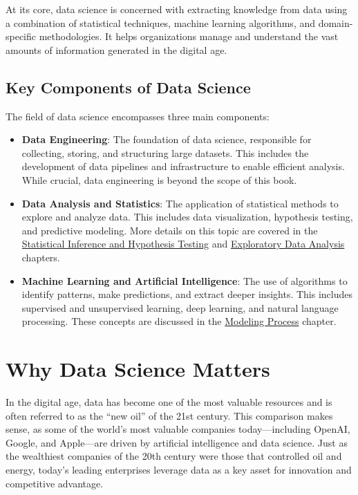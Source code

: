\documentclass[
  11pt,
]{book}
\providecommand{\tightlist}{%
  \setlength{\itemsep}{0pt}\setlength{\parskip}{0pt}}
\theoremstyle{definition}
\theoremstyle{definition}
\theoremstyle{definition}
\theoremstyle{definition}
\theoremstyle{remark}
\begin{document}
At its core, data science is concerned with extracting knowledge from data using a combination of statistical techniques, machine learning algorithms, and domain-specific methodologies. It helps organizations manage and understand the vast amounts of information generated in the digital age.

\subsection*{Key Components of Data Science}\label{key-components-of-data-science}


The field of data science encompasses three main components:

\begin{itemize}
\tightlist
\item
  \textbf{Data Engineering}: The foundation of data science, responsible for collecting, storing, and structuring large datasets. This includes the development of data pipelines and infrastructure to enable efficient analysis. While crucial, data engineering is beyond the scope of this book.\\
\item
  \textbf{Data Analysis and Statistics}: The application of statistical methods to explore and analyze data. This includes data visualization, hypothesis testing, and predictive modeling. More details on this topic are covered in the \hyperref[chapter-statistics]{Statistical Inference and Hypothesis Testing} and \hyperref[chapter-EDA]{Exploratory Data Analysis} chapters.\\
\item
  \textbf{Machine Learning and Artificial Intelligence}: The use of algorithms to identify patterns, make predictions, and extract deeper insights. This includes supervised and unsupervised learning, deep learning, and natural language processing. These concepts are discussed in the \hyperref[chapter-modeling]{Modeling Process} chapter.
\end{itemize}

\section{Why Data Science Matters}\label{why-data-science-matters}

In the digital age, data has become one of the most valuable resources and is often referred to as the ``new oil'' of the 21st century. This comparison makes sense, as some of the world's most valuable companies today---including OpenAI, Google, and Apple---are driven by artificial intelligence and data science. Just as the wealthiest companies of the 20th century were those that controlled oil and energy, today's leading enterprises leverage data as a key asset for innovation and competitive advantage.
\end{document}
